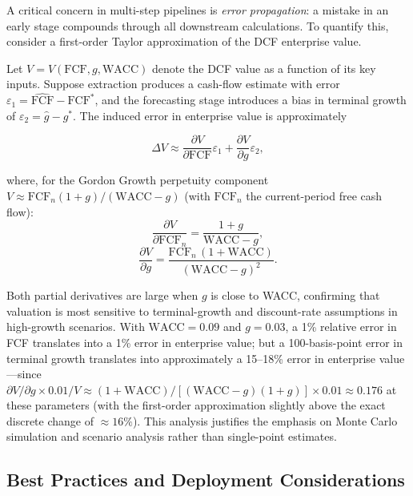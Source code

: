 \begin{deepdive}
A critical concern in multi-step pipelines is \emph{error propagation}: a mistake
in an early stage compounds through all downstream calculations. To quantify this,
consider a first-order Taylor approximation of the DCF enterprise value.

Let $V = V(\mathrm{FCF}, g, \mathrm{WACC})$ denote the DCF value as a function of
its key inputs. Suppose extraction produces a cash-flow estimate with error
$\varepsilon_1 = \hat{\mathrm{FCF}} - \mathrm{FCF}^*$, and the forecasting stage
introduces a bias in terminal growth of $\varepsilon_2 = \hat{g} - g^*$.
The induced error in enterprise value is approximately

\begin{equation}
\label{eq:error-propagation}
\Delta V \approx \frac{\partial V}{\partial \mathrm{FCF}} \varepsilon_1
             + \frac{\partial V}{\partial g} \varepsilon_2,
\end{equation}

where, for the Gordon Growth perpetuity component $V \approx \mathrm{FCF}_n(1+g)/(\mathrm{WACC}-g)$
(with $\mathrm{FCF}_n$ the current-period free cash flow):
\begin{equation}
\label{eq:dv-dfcf}
\frac{\partial V}{\partial \mathrm{FCF}_n} = \frac{1+g}{\mathrm{WACC} - g},
\end{equation}
\begin{equation}
\label{eq:dv-dg}
\frac{\partial V}{\partial g} = \frac{\mathrm{FCF}_n\,(1 + \mathrm{WACC})}{(\mathrm{WACC} - g)^2}.
\end{equation}

Both partial derivatives are large when $g$ is close to WACC, confirming that
valuation is most sensitive to terminal-growth and discount-rate assumptions in
high-growth scenarios. With $\mathrm{WACC} = 0.09$ and $g = 0.03$, a 1\% relative
error in FCF translates into a 1\% error in enterprise value; but a 100-basis-point
error in terminal growth translates into approximately a 15--18\% error in enterprise
value---since $\partial V / \partial g \times 0.01 / V \approx (1+\mathrm{WACC})/[(\mathrm{WACC}-g)(1+g)] \times 0.01 \approx 0.176$ at these parameters (with the first-order approximation slightly above the exact discrete change of $\approx 16\%$). This analysis
justifies the emphasis on Monte Carlo simulation and scenario analysis rather than
single-point estimates.

\subsection{Best Practices and Deployment Considerations}
\label{subsec:bv-efficiency-bestpractices}


\end{deepdive}
